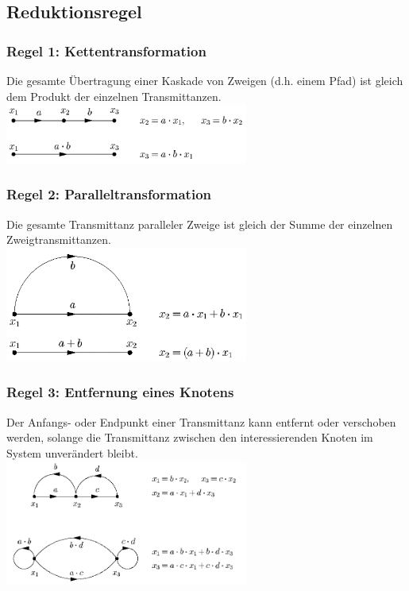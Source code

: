 	\subsection{Reduktionsregel }
	    \begin{multicols}{2}
	      \subsubsection{Regel 1: Kettentransformation }
		      Die gesamte Übertragung einer Kaskade von Zweigen (d.h. einem Pfad) ist gleich dem Produkt der einzelnen Transmittanzen. \\
		      \includegraphics[width=8cm]{./bilder/kettentransformation.png}
	      
	      \subsubsection{Regel 2: Paralleltransformation }
		      Die gesamte Transmittanz paralleler Zweige ist gleich der Summe der einzelnen Zweigtransmittanzen. \\
		      \includegraphics[width=8cm]{./bilder/paralleltransformation.png}
	      
	      \subsubsection{Regel 3: Entfernung eines Knotens }
		      Der Anfangs- oder Endpunkt einer Transmittanz kann entfernt oder verschoben werden, solange die Transmittanz zwischen den interessierenden Knoten im System unverändert bleibt. \\
		      \includegraphics[width=8cm]{./bilder/entfernungeinesknotens.png}


\end{multicols}
